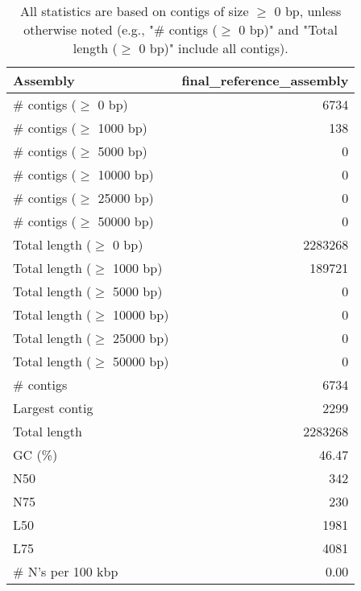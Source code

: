 \documentclass[12pt,a4paper]{article}
\begin{document}
\begin{table}[ht]
\begin{center}
\caption{All statistics are based on contigs of size $\geq$ 0 bp, unless otherwise noted (e.g., "\# contigs ($\geq$ 0 bp)" and "Total length ($\geq$ 0 bp)" include all contigs).}
\begin{tabular}{|l*{1}{|r}|}
\hline
Assembly & final\_reference\_assembly \\ \hline
\# contigs ($\geq$ 0 bp) & 6734 \\ \hline
\# contigs ($\geq$ 1000 bp) & 138 \\ \hline
\# contigs ($\geq$ 5000 bp) & 0 \\ \hline
\# contigs ($\geq$ 10000 bp) & 0 \\ \hline
\# contigs ($\geq$ 25000 bp) & 0 \\ \hline
\# contigs ($\geq$ 50000 bp) & 0 \\ \hline
Total length ($\geq$ 0 bp) & 2283268 \\ \hline
Total length ($\geq$ 1000 bp) & 189721 \\ \hline
Total length ($\geq$ 5000 bp) & 0 \\ \hline
Total length ($\geq$ 10000 bp) & 0 \\ \hline
Total length ($\geq$ 25000 bp) & 0 \\ \hline
Total length ($\geq$ 50000 bp) & 0 \\ \hline
\# contigs & 6734 \\ \hline
Largest contig & 2299 \\ \hline
Total length & 2283268 \\ \hline
GC (\%) & 46.47 \\ \hline
N50 & 342 \\ \hline
N75 & 230 \\ \hline
L50 & 1981 \\ \hline
L75 & 4081 \\ \hline
\# N's per 100 kbp & 0.00 \\ \hline
\end{tabular}
\end{center}
\end{table}
\end{document}
